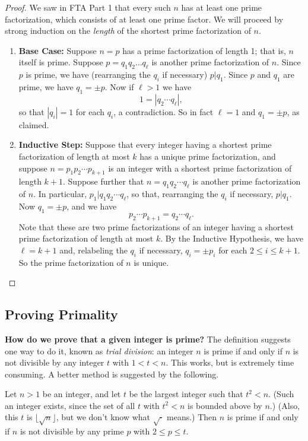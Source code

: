 \documentclass{article}
\begin{document}
\begin{proof}
We saw in FTA Part 1 that every such $n$ has at least one prime factorization, which consists of at least one prime factor. We will proceed by strong induction on the \emph{length} of the shortest prime factorization of $n$.
\begin{enumerate}
\item \textbf{Base Case:} Suppose $n = p$ has a prime factorization of length 1; that is, $n$ itself is prime. Suppose $p = q_1q_2 \ldots q_\ell$ is another prime factorization of $n$. Since $p$ is prime, we have (rearranging the $q_i$ if necessary) $p|q_1$. Since $p$ and $q_1$ are prime, we have $q_1 = \pm p$. Now if $\ell > 1$ we have \[ 1 = |q_2 \cdots q_\ell|, \] so that $|q_i| = 1$ for each $q_i$, a contradiction. So in fact $\ell = 1$ and $q_1 = \pm p$, as claimed.
\item \textbf{Inductive Step:} Suppose that every integer having a shortest prime factorization of length at most $k$ has a unique prime factorization, and suppose $n = p_1p_2 \cdots p_{k+1}$ is an integer with a shortest prime factorization of length $k+1$. Suppose further that $n = q_1q_2 \cdots q_\ell$ is another prime factorization of $n$. In particular, $p_1 | q_1q_2 \cdots q_\ell$, so that, rearranging the $q_i$ if necessary, $p|q_1$. Now $q_1 = \pm p$, and we have \[p_2 \cdots p_{k+1} = q_2 \cdots q_\ell. \] Note that these are two prime factorizations of an integer having a shortest prime factorization of length at most $k$. By the Inductive Hypothesis, we have $\ell = k+1$ and, relabeling the $q_i$ if necessary, $q_i = \pm p_i$ for each $2 \leq i \leq k+1$. So the prime factorization of $n$ is unique. \qedhere
\end{enumerate}
\end{proof}



\subsection*{Proving Primality}

\textbf{How do we prove that a given integer is prime?} The definition suggests one way to do it, known as \emph{trial division}: an integer $n$ is prime if and only if $n$ is not divisible by any integer $t$ with $1 < t < n$. This works, but is extremely time consuming. A better method is suggested by the following.

\begin{prop}
Let $n > 1$ be an integer, and let $t$ be the largest integer such that $t^2 < n$. (Such an integer exists, since the set of all $t$ with $t^2 < n$ is bounded above by $n$.) (Also, this $t$ is $\lfloor \sqrt{n} \rfloor$, but we don't know what $\sqrt{\cdot}$ means.) Then $n$ is prime if and only if $n$ is not divisible by any prime $p$ with $2 \leq p \leq t$.
\end{prop}
\end{document}
